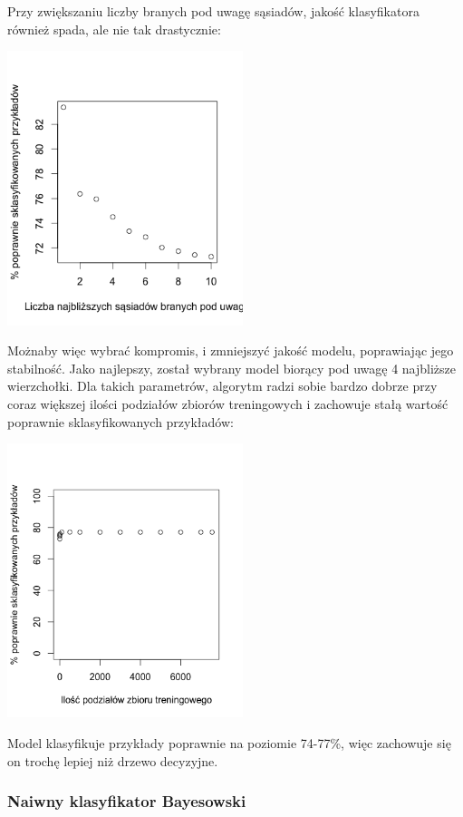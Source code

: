 \documentclass[11pt]{article} %
\begin{document}
Przy zwiększaniu liczby branych pod uwagę sąsiadów, jakość klasyfikatora również spada, ale nie tak drastycznie:

\begin{center}
	\includegraphics[height=8cm]{knn}
\end{center}

Możnaby więc wybrać kompromis, i zmniejszyć jakość modelu, poprawiając jego stabilność. Jako najlepszy, został wybrany model biorący pod uwagę 4 najbliższe wierzchołki. Dla takich parametrów, algorytm radzi sobie bardzo dobrze przy coraz większej ilości podziałów zbiorów treningowych i zachowuje stałą wartość poprawnie sklasyfikowanych przykładów:

\begin{center}
	\includegraphics[height=8cm]{knn-cv}
\end{center}

Model klasyfikuje przykłady poprawnie na poziomie 74-77\%, więc zachowuje się on trochę lepiej niż drzewo decyzyjne.

\subsubsection{Naiwny klasyfikator Bayesowski}
\end{document}
